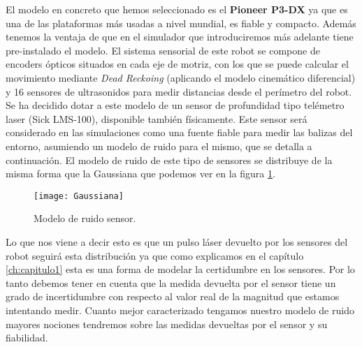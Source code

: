 El modelo en concreto que hemos seleccionado es el \textbf{Pioneer P3-DX} \cite{_pioneer_2016} ya que es una de las plataformas más usadas a nivel mundial, es fiable y compacto.
%
%
%
Además tenemos la ventaja de que en el simulador que introduciremos más adelante tiene pre-instalado el modelo.
El sistema sensorial de este robot se compone de encoders ópticos situados en cada eje de motriz, con los que se puede calcular el movimiento mediante \textit{Dead Reckoing }(aplicando el modelo cinemático diferencial) y 16 sensores de ultrasonidos para medir distancias desde el perímetro del robot. Se ha decidido dotar a este modelo de un sensor de profundidad tipo telémetro laser (Sick LMS-100), disponible también físicamente. Este sensor será considerado en las simulaciones como una fuente fiable para medir las balizas del entorno, asumiendo un modelo de ruido para el mismo, que se detalla a continuación.
El modelo de ruido de este tipo de sensores se distribuye de la misma forma que la Gaussiana que podemos ver en la figura \ref{Modelo_ruido}.
\begin{figure}[ht!]
\centering
\texttt{[image: Gaussiana]}
\caption{Modelo de ruido sensor.} \label{Modelo_ruido}
\end{figure}
Lo que nos viene a decir esto es que un pulso láser devuelto por los sensores del robot seguirá esta distribución ya que como explicamos en el capítulo \ref{ch:capitulo1} esta es una forma de modelar la certidumbre en los sensores.
Por lo tanto debemos tener en cuenta que la medida devuelta por el sensor tiene un grado de incertidumbre con respecto al valor real de la magnitud que estamos intentando medir.
Cuanto mejor caracterizado tengamos nuestro modelo de ruido mayores nociones tendremos sobre las medidas devueltas por el sensor y su fiabilidad. 

